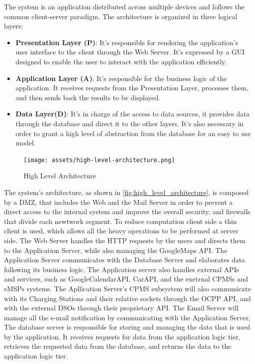 \documentclass[table, 12pt]{article}
\begin{document}
The system is an application distributed across multiple devices and follows the common client-server paradigm.
The architecture is organized in three logical layers:

\begin{itemize}
    \item \textbf{Presentation Layer (P)}: It's responsible for rendering the application's user interface to the client through the Web Server. It's expressed by a GUI designed to enable the user to interact with the application efficiently.
    \item \textbf{Application Layer (A)}: It's responsible for the business logic of the application. It receives requests from the Presentation Layer, processes them, and then sends back the results to be displayed.
    \item \textbf{Data Layer(D)}: It's in charge of the access to data sources, it provides data through the database and direct it to the other layers. It's also necessary in order to grant a high level of abstraction from the database for an easy to use model.
\end{itemize}

\newpage
\begin{center}
    \begin{figure}[H]
        \texttt{[image: assets/high-level-architecture.png]}
        \caption{High Level Architecture}
        \label{fig: high_level_architecture}
    \end{figure}
\end{center}

The system's architecture, as shown in \ref{fig:high_level_architecture}, is composed by a DMZ, that includes the Web and the Mail Server in order to prevent a direct access to the internal system and improve the overall security, and firewalls that divide each newtwork segment.
To reduce computation client side a thin client is used, which allows all the heavy operations to be performed at server side. The Web Server handles the HTTP requests by the users and directs them to the Application Server, while also managing the GoogleMaps API. 
The Application Server communicates with the Database Server and elaborates data following its business logic. The Application server also handles external APIs and services, such as GoogleCalendarAPI, CarAPI, and the exetrnal CPMSs and eMSPs systems.
The Apllication Server's CPMS subsystem will also communicate with its Charging Stations and their relative sockets through the OCPP API, and with the external DSOs through their proprietary API.
The Email Server will manage all the e-mail notification by communicating with the Application Server, The database server is responsible for storing and managing the data that is used by the application. It receives requests for data from the application logic tier, retrieves the requested data from the database, and returns the data to the application logic tier.
\end{document}
